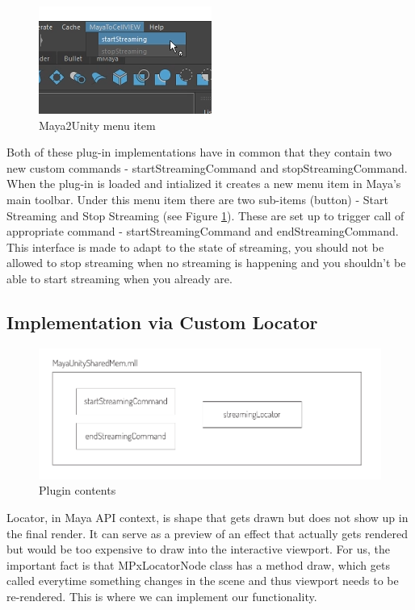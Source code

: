 \documentclass[
  digital, %
  table,   %
  nolof,     %
  nolot,     %
]{fithesis3}
\begin{document}
\begin{figure}
  \centering
  \includegraphics{images/maya-to-unity-menu.png}
  \caption{Maya2Unity menu item}
  \label{fig:maya-menu-item}
\end{figure}

Both of these plug-in implementations have in common that they contain two new custom commands - startStreamingCommand and stopStreamingCommand. When the plug-in is loaded and intialized it creates a new menu item in Maya's main toolbar. Under this menu item there are two sub-items (button) - Start Streaming and Stop Streaming (see Figure \ref{fig:maya-menu-item}). These are set up to trigger call of appropriate command - startStreamingCommand and endStreamingCommand. This interface is made to adapt to the state of streaming, you should not be allowed to stop streaming when no streaming is happening and you shouldn't be able to start streaming when you already are.

\subsection{Implementation via Custom Locator}
\begin{figure}
  \centering
  \includegraphics[scale=0.8]{images/plugin-contents.pdf}
  \caption{Plugin contents}
  \label{fig:plugin-content}
\end{figure}
Locator, in Maya API context, is shape that gets drawn but does not show up in the final render. It can serve as a preview of an effect that actually gets rendered but would be too expensive to draw into the interactive viewport. For us, the important fact is that MPxLocatorNode class has a method draw, which gets called everytime something changes in the scene and thus viewport needs to be re-rendered. This is where we can implement our functionality.
\end{document}
